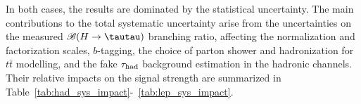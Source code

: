 In both cases, the results are dominated by the statistical uncertainty.
The main contributions to the total systematic uncertainty arise from the uncertainties on the measured $\BR(H\to \tautau)$ branching ratio,
affecting the normalization and factorization scales, $b$-tagging, the choice of parton shower and hadronization for $t\bar t$ modelling, and the fake $\tau_{\mathrm{had}}$ background estimation in the hadronic channels. Their relative impacts on the signal strength are summarized in Table~\ref{tab:had_sys_impact}-~\ref{tab:lep_sys_impact}.
